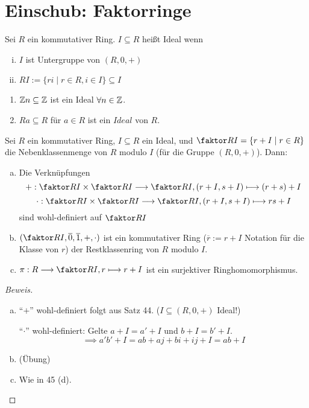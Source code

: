 \documentclass[a4paper]{report}
\begin{document}
\section{Einschub: Faktorringe}
\begin{defi}
  Sei $R$ ein kommutativer Ring. $I \subseteq R$ heißt Ideal wenn
  \begin{enumerate}[(i)]
    \item $I$ ist Untergruppe von $(R, 0, +)$
    \item $RI := \{ri \mid r \in R, i \in I\} \subseteq I$
  \end{enumerate}
\end{defi}
\begin{bsp*}
  \begin{enumerate}[1)]
    \item $\Bbb Zn \subseteq \Bbb Z$ ist ein Ideal $\forall n \in \Bbb Z$.
    \item $Ra \subseteq R$ für $a \in R$ ist ein $Ideal$ von $R$.
  \end{enumerate}
\end{bsp*}

\begin{satz}
  Sei $R$ ein kommutativer Ring, $I \subseteq R$ ein Ideal, und $\faktor RI = \{r + I \mid r \in R\}$ die Nebenklassenmenge von $R$ modulo $I$ (für die Gruppe $(R, 0, +)$). Dann:
  \begin{enumerate}[(a)]
    \item Die Verknüpfungen $$+ : \faktor RI \times \faktor RI \longrightarrow \faktor RI, (r+I, s+I) \longmapsto (r+s)+I$$
          $$\cdot : \faktor RI \times \faktor RI \longrightarrow \faktor RI, (r+I, s+I) \longmapsto rs+I$$
          sind wohl-definiert auf $\faktor RI$

    \item $(\faktor RI, \overline 0, \overline 1, +, \cdot)$ ist ein kommutativer Ring ($\overline r := r + I$ Notation für die Klasse von $r$) der Restklassenring von $R$ modulo $I$.
    \item $\pi : R \longrightarrow \faktor RI, r \longmapsto r+I$ ist ein surjektiver Ringhomomorphismus.
  \end{enumerate}
\begin{proof}[Beweis]
\begin{enumerate}[(a)]
  \item ``$+$'' wohl-definiert folgt aus Satz 44. ($I \subseteq (R, 0, +)$ Ideal!)

        ``$\cdot$''  wohl-definiert: Gelte $a+I = a'+I$ und $b+I = b'+I$.
        $$\implies a'b' + I = ab + aj + bi + ij + I = ab + I$$
  \item (Übung)
  \item Wie in 45 (d). \qedhere
\end{enumerate}
\end{proof}
\end{satz}
\end{document}
